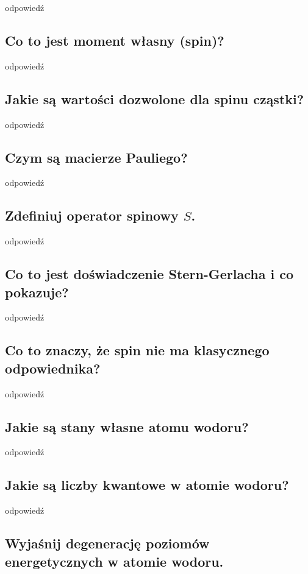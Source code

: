 odpowiedź

\subsection{Co to jest moment własny (spin)?}

odpowiedź

\subsection{Jakie są wartości dozwolone dla spinu cząstki?}

odpowiedź

\subsection{Czym są macierze Pauliego?}

odpowiedź

\subsection{Zdefiniuj operator spinowy $S$.}

odpowiedź

\subsection{Co to jest doświadczenie Stern-Gerlacha i co pokazuje?}

odpowiedź

\subsection{Co to znaczy, że spin nie ma klasycznego odpowiednika?}

odpowiedź

\subsection{Jakie są stany własne atomu wodoru?}

odpowiedź

\subsection{Jakie są liczby kwantowe w atomie wodoru?}

odpowiedź

\subsection{Wyjaśnij degenerację poziomów energetycznych w atomie wodoru.}


